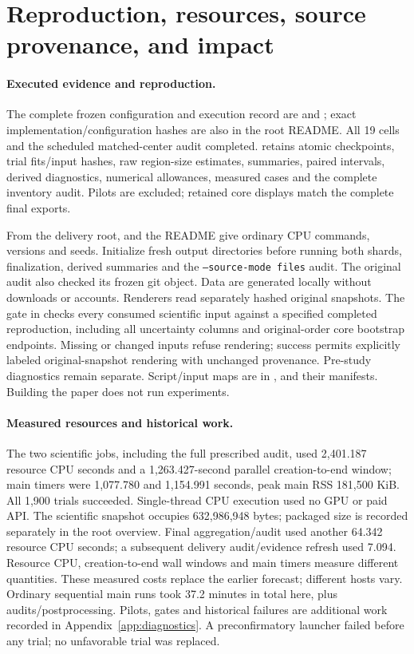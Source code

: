 \section{Reproduction, resources, source provenance, and impact}
\label{sec:process}
\paragraph{Executed evidence and reproduction.}
The complete frozen configuration and execution record are  and ; exact implementation/configuration hashes are also in the root README. All 19 cells and the scheduled matched-center audit completed.  retains atomic checkpoints, trial fits/input hashes, raw region-size estimates, summaries, paired intervals, derived diagnostics, numerical allowances, measured cases and the complete inventory audit. Pilots are excluded; retained core displays match the complete final exports.

From the delivery root,  and the README give ordinary CPU commands, versions and seeds. Initialize fresh output directories before running both shards, finalization, derived summaries and the \texttt{--source-mode files} audit. The original audit also checked its frozen git object. Data are generated locally without downloads or accounts. Renderers read separately hashed original snapshots. The gate in  checks every consumed scientific input against a specified completed reproduction, including all uncertainty columns and original-order core bootstrap endpoints. Missing or changed inputs refuse rendering; success permits explicitly labeled original-snapshot rendering with unchanged provenance. Pre-study diagnostics remain separate. Script/input maps are in ,  and their manifests. Building the paper does not run experiments.

\paragraph{Measured resources and historical work.}
The two scientific jobs, including the full prescribed audit, used 2,401.187 resource CPU seconds and a 1,263.427-second parallel creation-to-end window; main timers were 1,077.780 and 1,154.991 seconds, peak main RSS 181,500 KiB. All 1,900 trials succeeded. Single-thread CPU execution used no GPU or paid API. The scientific snapshot occupies 632,986,948 bytes; packaged size is recorded separately in the root overview. Final aggregation/audit used another 64.342 resource CPU seconds; a subsequent delivery audit/evidence refresh used 7.094. Resource CPU, creation-to-end wall windows and main timers measure different quantities. These measured costs replace the earlier forecast; different hosts vary. Ordinary sequential main runs took 37.2 minutes in total here, plus audits/postprocessing. Pilots, gates and historical failures are additional work recorded in Appendix~\ref{app:diagnostics}. A preconfirmatory launcher failed before any trial; no unfavorable trial was replaced.

